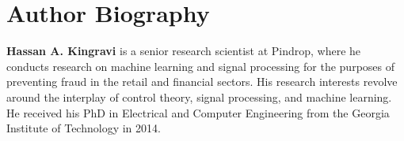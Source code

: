 \documentclass[letterpaper,12pt,peerreviewca,draftcls]{IEEEtran}
\newcommand{\XX}[1]{{\bf \color{orange}{ XX #1 XX}}}
\begin{document}
\processdelayedfloats
\sidebars
%    		

\renewcommand{\thealgorithm}{S\arabic{algorithm}} 
\setcounter{algorithm}{0}

\clearpage

\processdelayedfloats

\clearpage

\processdelayedfloats

\clearpage

\processdelayedfloats



\newpage
\section{Author Biography}
\noindent \textbf{Hassan A. Kingravi}  is a senior research scientist
at Pindrop, where he conducts research on machine
learning and signal processing for the purposes of
preventing fraud in the retail and financial sectors.
His research interests revolve around the interplay
of control theory, signal processing, and machine
learning. He received his PhD in Electrical and
Computer Engineering from the Georgia Institute
of Technology in 2014.
\end{document}
